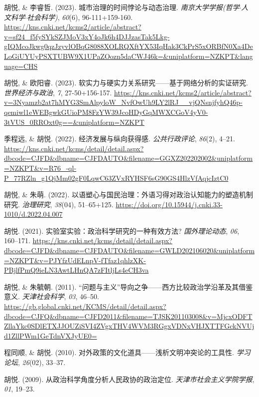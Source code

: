 \documentclass[
  12pt,
]
{article}
\newlength{\cslhangindent}
\newenvironment{CSLReferences}[2] %
 {\begin{list}{}{%
  \setlength{\itemindent}{0pt}
  \setlength{\leftmargin}{0pt}
  \setlength{\parsep}{0pt}
  \ifodd #1
   \setlength{\leftmargin}{\cslhangindent}
   \setlength{\itemindent}{-1\cslhangindent}
  \fi
  \setlength{\itemsep}{#2\baselineskip}}}
 {\end{list}}
\begin{document}
\label{refs-chinese}
\begin{CSLReferences}{1}{0}
胡悦, \& 李睿哲. (2023). 城市治理的时间悖论与动态治理.
\emph{南京大学学报(哲学{\(\cdot\)}人文科学{\(\cdot\)}社会科学)},
\emph{60}(6), 96-111+159-160.
\url{https://kns.cnki.net/kcms2/article/abstract?v=sf24_f5fySYkSZJMoV3xY4oJk6h4DJJzasTak5Lkg-gIQMcoJkwg0qzJzyvlOBqG8088XOLRQXftYX53IqHak3CkPrS5xORBfN0Xa4DeLoGiUYUyPSXTUBW9X1UPaZOozn5daCWJ46k=&uniplatform=NZKPT&language=CHS}

胡悦, \& 欧阳睿. (2023).
软实力与硬实力关系研究------基于网络分析的实证研究.
\emph{世界经济与政治}, \emph{7}, 27-50+156-157.
\url{https://kns.cnki.net/kcms2/article/abstract?v=3Nyamzb2at7hMYG3SmAlpyloW_NvfOwUh9LY2lRJ__vjQNsnjfyhQ46p-qemiwl1eWEBgwkGUioPM8FzYW39JcoHDyGqMWXCGoV4yV0-3tVUS_0RROxt0g==&uniplatform=NZKPT}

季程远, \& 胡悦. (2022). 经济发展与纵向获得感. \emph{公共行政评论},
\emph{86}(2), 4--21.
\url{https://kns.cnki.net/kcms/detail/detail.aspx?dbcode=CJFD&dbname=CJFDAUTO&filename=GGXZ202202002&uniplatform=NZKPT&v=R76_-ql-P_77RZln_g1QjMm02gF0LqwC63ZVxRYHSF6sG90GS4HlzVfAqjcIztC0}

胡悦, \& 朱萌. (2022).
以语塑心与国民治理：外语习得对政治认知能力的塑造机制研究.
\emph{治理研究}, \emph{38}(04), 51--65+125.
\url{https://doi.org/10.15944/j.cnki.33-1010/d.2022.04.007}

胡悦. (2021). 实验室实验：政治科学研究的一种有效方法?
\emph{国外理论动态}, \emph{06}, 160--171.
\url{https://kns.cnki.net/kcms/detail/detail.aspx?dbcode=CJFD&dbname=CJFDAUTO&filename=GWLD202106020&uniplatform=NZKPT&v=PJYfzUdELnpV-fTfaz1qhlzXK-PBjlfPmQ9ieLN3AwtLHnQA7zFItljLs4eCH3va}

胡悦, \& 朱毓朝. (2011).
{``问题与主义''}导向之争------西方比较政治学沿革及其借鉴意义.
\emph{天津社会科学}, \emph{03}, 46--50.
\url{https://gb.global.cnki.net/KCMS/detail/detail.aspx?dbcode=CJFQ&dbname=CJFD2011&filename=TJSK201103008&v=MjcxODFTZllaYkc0SDlETXJJOUZiSVI4ZVgxTHV4WVM3RGgxVDNxVHJXTTFGckNVUjd1ZllPWm1GeTdnVXJyUE0=}

程同顺, \& 胡悦. (2010). 对外政策的文化道具------浅析文明冲突论的工具性.
\emph{学习论坛}, \emph{26}(02), 33--37.

胡悦. (2009). 从政治科学角度分析人民政协的政治定位.
\emph{天津市社会主义学院学报}, \emph{01}, 19--23.

\end{CSLReferences}
\end{document}
